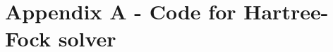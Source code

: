 \documentclass[a4paper, 11pt, notitlepage, english]{article}
\newcommand{\brakket}[2]{\langle #1 || #2 \rangle}
\newcommand{\op}[1]{\hat{#1}}
\newcommand{\braopket}[3]{\langle #1 | {#2} | #3 \rangle}
\begin{document}
\clearpage

\section*{Appendix A - Code for Hartree-Fock solver}




\end{document}
